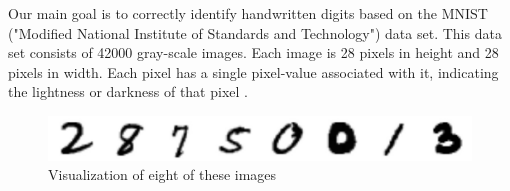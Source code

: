 Our main goal is to correctly identify handwritten digits based on the MNIST  ("Modified National Institute of Standards and Technology") data set.
This data set consists of 42000 gray-scale images. Each image is 28 pixels in height and 28 pixels in width. Each pixel has a single pixel-value associated with it, indicating the lightness or darkness of that pixel \cite{kaggel}.

\begin{figure}[h]
	\includegraphics[width=1\textwidth, center]{Digits2}
	\caption{Visualization of eight of these images}
\end{figure}
